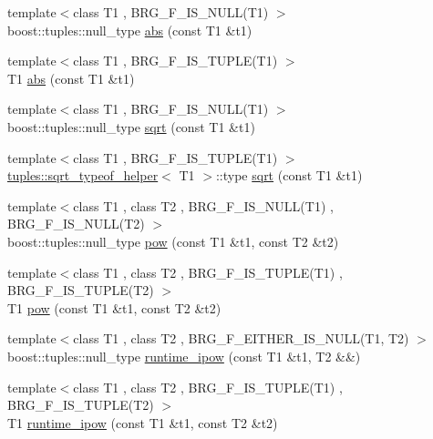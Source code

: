\begin{DoxyCompactItemize}
\item 
{\footnotesize template$<$class T1 , B\+R\+G\+\_\+\+F\+\_\+\+I\+S\+\_\+\+N\+U\+L\+L(\+T1) $>$ }\\boost\+::tuples\+::null\+\_\+type \hyperlink{namespaceIceBRG_a2711f4882a0617bdc9f86be0b55c3c62}{abs} (const T1 \&t1)
\item 
{\footnotesize template$<$class T1 , B\+R\+G\+\_\+\+F\+\_\+\+I\+S\+\_\+\+T\+U\+P\+L\+E(\+T1) $>$ }\\T1 \hyperlink{namespaceIceBRG_a26641f6efbb3a938bb24d35ed496af37}{abs} (const T1 \&t1)
\item 
{\footnotesize template$<$class T1 , B\+R\+G\+\_\+\+F\+\_\+\+I\+S\+\_\+\+N\+U\+L\+L(\+T1) $>$ }\\boost\+::tuples\+::null\+\_\+type \hyperlink{namespaceIceBRG_a29ad5c8dedd7627497789f6c9e4b1068}{sqrt} (const T1 \&t1)
\item 
{\footnotesize template$<$class T1 , B\+R\+G\+\_\+\+F\+\_\+\+I\+S\+\_\+\+T\+U\+P\+L\+E(\+T1) $>$ }\\\hyperlink{namespaceIceBRG_1_1tuples_structIceBRG_1_1tuples_1_1sqrt__typeof__helper}{tuples\+::sqrt\+\_\+typeof\+\_\+helper}$<$ T1 $>$\+::type \hyperlink{namespaceIceBRG_a3deab82e87d7871fcee1c80229eae766}{sqrt} (const T1 \&t1)
\item 
{\footnotesize template$<$class T1 , class T2 , B\+R\+G\+\_\+\+F\+\_\+\+I\+S\+\_\+\+N\+U\+L\+L(\+T1) , B\+R\+G\+\_\+\+F\+\_\+\+I\+S\+\_\+\+N\+U\+L\+L(\+T2) $>$ }\\boost\+::tuples\+::null\+\_\+type \hyperlink{namespaceIceBRG_afaba16ae171db13e29a3e0817c663f63}{pow} (const T1 \&t1, const T2 \&t2)
\item 
{\footnotesize template$<$class T1 , class T2 , B\+R\+G\+\_\+\+F\+\_\+\+I\+S\+\_\+\+T\+U\+P\+L\+E(\+T1) , B\+R\+G\+\_\+\+F\+\_\+\+I\+S\+\_\+\+T\+U\+P\+L\+E(\+T2) $>$ }\\T1 \hyperlink{namespaceIceBRG_a1df1260c6f6ca6ef2b2d336f2908825b}{pow} (const T1 \&t1, const T2 \&t2)
\item 
{\footnotesize template$<$class T1 , class T2 , B\+R\+G\+\_\+\+F\+\_\+\+E\+I\+T\+H\+E\+R\+\_\+\+I\+S\+\_\+\+N\+U\+L\+L(\+T1, T2) $>$ }\\boost\+::tuples\+::null\+\_\+type \hyperlink{namespaceIceBRG_ae5afc3a219af15dc1c73a15ca40486ce}{runtime\+\_\+ipow} (const T1 \&t1, T2 \&\&)
\item 
{\footnotesize template$<$class T1 , class T2 , B\+R\+G\+\_\+\+F\+\_\+\+I\+S\+\_\+\+T\+U\+P\+L\+E(\+T1) , B\+R\+G\+\_\+\+F\+\_\+\+I\+S\+\_\+\+T\+U\+P\+L\+E(\+T2) $>$ }\\T1 \hyperlink{namespaceIceBRG_a7b6ce9eb65d0d796d9a8239a620aa50c}{runtime\+\_\+ipow} (const T1 \&t1, const T2 \&t2)

\end{DoxyCompactItemize}
